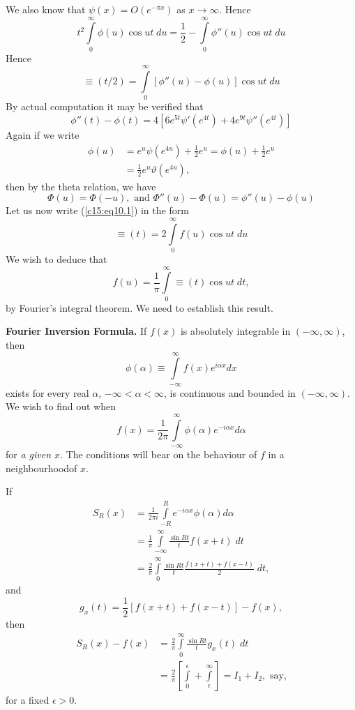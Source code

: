 We also know that $\psi(x) = O(e^{-\pi x})$ as $x \to \infty$. Hence
$$
t^2 \int\limits^\infty_0 \phi(u) \cos u t \; du = \frac{1}{2} -
\int\limits^\infty_0 \phi''(u) \cos ut \; du
$$ 
Hence\pageoriginale
\begin{equation*}
\equiv (t/2) = \int\limits^\infty_0 [\phi''(u) - \phi(u)] \cos ut \;
du \tag{10.1}\label{c15:eq10.1}
\end{equation*}
By actual computation it may be verified that
$$
\phi''(t) - \phi(t) = 4 [6e^{5t} \psi'(e^{4t}) + 4 e^{9t} 
  \psi''(e^{4t})] 
$$
Again if we write
\begin{align*}
\phi(u) & = e^u \psi(e^{4u}) + \frac{1}{2} e^u = \phi(u) + \frac{1}{2} e^u\\
& = \frac{1}{2} e^u \vartheta (e^{4u}),
\end{align*}
then by the theta relation, we have
$$
\Phi (u) = \Phi(-u), \text{ and } \Phi''(u) - \Phi (u) = \phi''(u) -
\phi (u)
$$
Let us now write (\ref{c15:eq10.1}) in the form
$$
\equiv (t) = 2 \int\limits^\infty_0 f(u) \cos ut \; du
$$
We wish to deduce that
\begin{equation*}
f(u) = \frac{1}{\pi} \int\limits^\infty_0 \equiv (t) \cos ut \; dt, 
 \tag{10.2}\label{c15:eq10.2}
\end{equation*}
by Fourier's integral theorem. We need to establish this result.


\medskip
\noindent\textbf{Fourier Inversion Formula.}\cite[p.10]{key5} 
If $f(x)$ is absolutely integrable in $(-\infty, \infty)$, then 
$$
\phi (\alpha) \equiv \int\limits^\infty_{-\infty} f(x) e^{i\alpha x}
dx 
$$
exists for every real $\alpha$, $-\infty < \alpha < \infty$, is
continuous and bounded in $(-\infty, \infty)$. We wish to find out
when 
$$
f(x) = \frac{1}{2\pi} \int\limits^\infty_{-\infty} \phi(\alpha) e^{-i
  \alpha x} d \alpha
$$
for {\em a given $x$}. The conditions will bear on the behaviour of $f$ in a 
neighbourhood\pageoriginale of $x$.

If 
\begin{align*}
S_R (x) & = \frac{1}{2\pi i} \int\limits^R_{-R}e^{-i\alpha x}
\phi(\alpha) d \alpha\\
& = \frac{1}{\pi} \int\limits^\infty_{-\infty} \frac{\sin Rt}{t}
f(x+t) \; dt\\
& = \frac{2}{\pi} \int\limits^\infty_{0} \frac{\sin Rt}{t}
\frac{f(x+t)+f(x-t)}{2} \; dt,
 \end{align*}
and
$$
g_x(t) = \frac{1}{2} \left[f(x+t) + f(x-t) \right] - f(x),
$$
then
\begin{align*}
S_R (x) - f(x) & = \frac{2}{\pi} \int\limits^\infty_0 \frac{\sin
  Rt}{t} g_x(t) \; dt\\
& = \frac{2}{\pi} \left[\int\limits^\epsilon_0 +
  \int\limits^\infty_\epsilon \right] = I_1 + I_2 , \text{ say,}
\end{align*}
for a fixed $\epsilon >0$.

